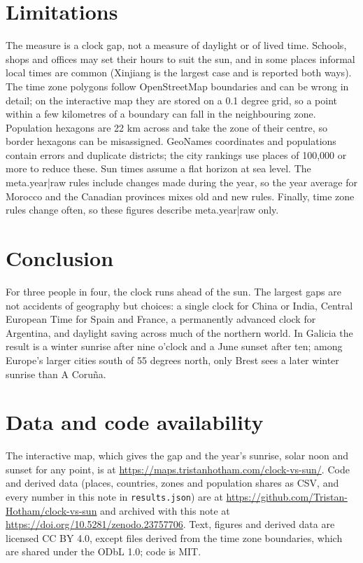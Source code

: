 \documentclass[11pt,a4paper]{article}
\begin{document}
\section{Limitations}

The measure is a clock gap, not a measure of daylight or of lived time. Schools, shops and offices may set their hours to suit the sun, and in some places informal local times are common (Xinjiang is the largest case and is reported both ways). The time zone polygons follow OpenStreetMap boundaries and can be wrong in detail; on the interactive map they are stored on a 0.1 degree grid, so a point within a few kilometres of a boundary can fall in the neighbouring zone. Population hexagons are 22 km across and take the zone of their centre, so border hexagons can be misassigned. GeoNames coordinates and populations contain errors and duplicate districts; the city rankings use places of 100,000 or more to reduce these. Sun times assume a flat horizon at sea level. The {{meta.year|raw}} rules include changes made during the year, so the year average for Morocco and the Canadian provinces mixes old and new rules. Finally, time zone rules change often, so these figures describe {{meta.year|raw}} only.

\section{Conclusion}

For three people in four, the clock runs ahead of the sun. The largest gaps are not accidents of geography but choices: a single clock for China or India, Central European Time for Spain and France, a permanently advanced clock for Argentina, and daylight saving across much of the northern world. In Galicia the result is a winter sunrise after nine o'clock and a June sunset after ten; among Europe's larger cities south of 55 degrees north, only Brest sees a later winter sunrise than A Coruña.

\section*{Data and code availability}

The interactive map, which gives the gap and the year's sunrise, solar noon and sunset for any point, is at \url{https://maps.tristanhotham.com/clock-vs-sun/}. Code and derived data (places, countries, zones and population shares as CSV, and every number in this note in \texttt{results.json}) are at \url{https://github.com/Tristan-Hotham/clock-vs-sun} and archived with this note at \url{https://doi.org/10.5281/zenodo.23757706}. Text, figures and derived data are licensed CC BY 4.0, except files derived from the time zone boundaries, which are shared under the ODbL 1.0; code is MIT.
\end{document}

